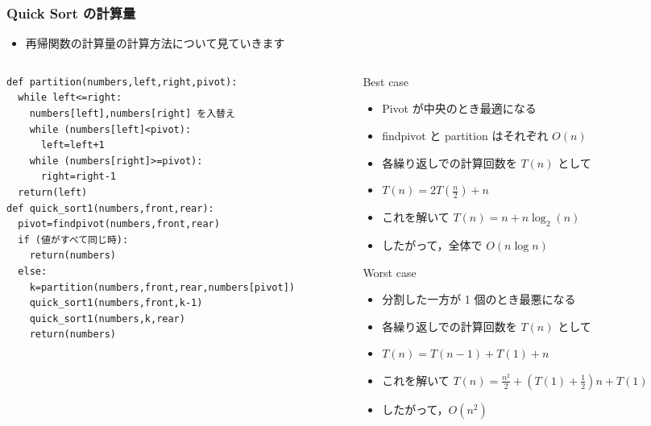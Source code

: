 \begin{frame}
\frametitle{Quick Sort の計算量}
  \begin{itemize}
\item 再帰関数の計算量の計算方法について見ていきます
  \end{itemize}
\vspace{-5mm}
  \begin{columns}[t,onlytextwidth]
    \begin{column}{0.45\linewidth}
      \begin{lstlisting}[caption={擬似コード},label=insertion_sort]
def partition(numbers,left,right,pivot):
  while left<=right:
    numbers[left],numbers[right] を入替え
    while (numbers[left]<pivot):
      left=left+1
    while (numbers[right]>=pivot):
      right=right-1
  return(left)
def quick_sort1(numbers,front,rear):
  pivot=findpivot(numbers,front,rear)
  if (値がすべて同じ時):
    return(numbers)
  else:
    k=partition(numbers,front,rear,numbers[pivot])
    quick_sort1(numbers,front,k-1)
    quick_sort1(numbers,k,rear)
    return(numbers)
      \end{lstlisting}
    \end{column}
    \begin{column}{0.5\linewidth}
      \begin{itembox}[l]{Best case}
        \begin{itemize}
\tiny
\item Pivot が中央のとき最適になる
\item findpivot と partition はそれぞれ $O(n)$
\item 各繰り返しでの計算回数を \(T(n)\) として
\item \(T(n)=2T(\frac{n}{2})+n\)
\item これを解いて \(T(n)=n+n\log_2(n)\)
\item したがって，全体で \(O(n\log n)\) 
        \end{itemize}
      \end{itembox}
      \begin{itembox}[l]{Worst case}
        \begin{itemize}
\tiny
\item 分割した一方が 1 個のとき最悪になる
\item 各繰り返しでの計算回数を \(T(n)\) として
\item \(T(n)=T(n-1)+T(1)+n\)
\item これを解いて \(T(n)=\frac{n^2}{2}+(T(1)+\frac{1}{2})n+T(1)\)
\item したがって，\(O(n^2)\)
        \end{itemize}
      \end{itembox}
    \end{column}
  \end{columns}
\end{frame}

